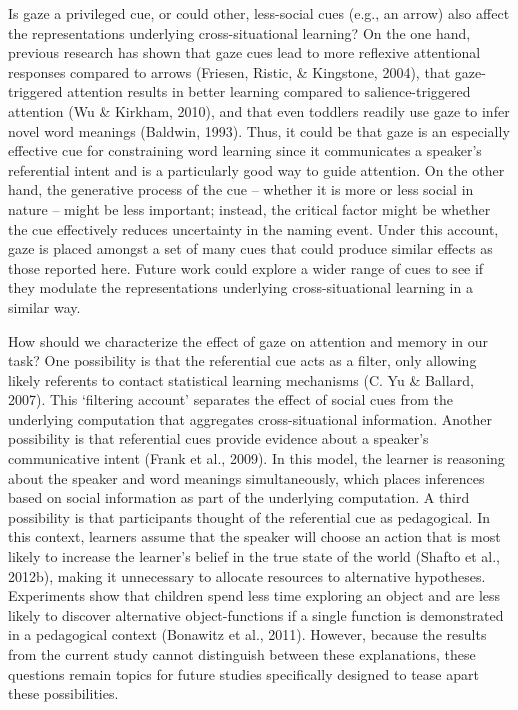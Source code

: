 \documentclass[oneside]{report}
\begin{document}
Is gaze a privileged cue, or could other, less-social cues (e.g., an
arrow) also affect the representations underlying cross-situational
learning? On the one hand, previous research has shown that gaze cues
lead to more reflexive attentional responses compared to arrows
(Friesen, Ristic, \& Kingstone, 2004), that gaze-triggered attention
results in better learning compared to salience-triggered attention (Wu
\& Kirkham, 2010), and that even toddlers readily use gaze to infer
novel word meanings (Baldwin, 1993). Thus, it could be that gaze is an
especially effective cue for constraining word learning since it
communicates a speaker's referential intent and is a particularly good
way to guide attention. On the other hand, the generative process of the
cue -- whether it is more or less social in nature -- might be less
important; instead, the critical factor might be whether the cue
effectively reduces uncertainty in the naming event. Under this account,
gaze is placed amongst a set of many cues that could produce similar
effects as those reported here. Future work could explore a wider range
of cues to see if they modulate the representations underlying
cross-situational learning in a similar way.

How should we characterize the effect of gaze on attention and memory in
our task? One possibility is that the referential cue acts as a filter,
only allowing likely referents to contact statistical learning
mechanisms (C. Yu \& Ballard, 2007). This `filtering account' separates
the effect of social cues from the underlying computation that
aggregates cross-situational information. Another possibility is that
referential cues provide evidence about a speaker's communicative intent
(Frank et al., 2009). In this model, the learner is reasoning about the
speaker and word meanings simultaneously, which places inferences based
on social information as part of the underlying computation. A third
possibility is that participants thought of the referential cue as
pedagogical. In this context, learners assume that the speaker will
choose an action that is most likely to increase the learner's belief in
the true state of the world (Shafto et al., 2012b), making it
unnecessary to allocate resources to alternative hypotheses. Experiments
show that children spend less time exploring an object and are less
likely to discover alternative object-functions if a single function is
demonstrated in a pedagogical context (Bonawitz et al., 2011). However,
because the results from the current study cannot distinguish between
these explanations, these questions remain topics for future studies
specifically designed to tease apart these possibilities.
\end{document}
